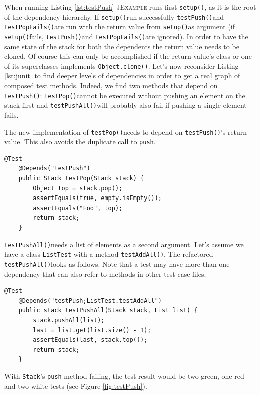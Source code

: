 \documentclass[11pt]{article}
\newcommand{\JExample}{\textsc{JExample}\xspace}
\newcommand{\ttt}[1]{\texttt{#1}}
\newcommand{\setup}{\ttt{setup()}}
\newcommand{\testPush}{\ttt{testPush()}}
\newcommand{\testPushAll}{\ttt{testPushAll()}}
\newcommand{\testPop}{\ttt{testPop()}}
\newcommand{\testPopFails}{\ttt{testPopFails()}}
\begin{document}
When running Listing \ref{lst:testPush} \JExample runs first \setup, as it is the root of the dependency hierarchy. If \setup run successfully \testPush and \testPopFails are run with the return value from \setup as argument (if \setup fails, \testPush and \testPopFails are ignored).
In order to have the same state of the stack for both the dependents the return value needs to be cloned. Of course this can only be accomplished if the return value's class or one of its superclasses implements \verb|Object.clone()|.
Let's now reconsider Listing \ref{lst:junit} to find deeper levels of dependencies in order to get a real graph of composed test methods.
Indeed, we find two methods that depend on \testPush: \testPop cannot be executed without pushing an element on the stack first and \testPushAll will probably also fail if pushing a single element fails.

The new implementation of \testPop needs to depend on \testPush's return value. This also avoids the duplicate call to \ttt{push}.

\begin{lstlisting}[label=lst:testpop,caption=Avoid code duplication using dependencies.]
    @Test
    @Depends("testPush")
    public Stack testPop(Stack stack) {
        Object top = stack.pop();
        assertEquals(true, empty.isEmpty());
        assertEquals("Foo", top);
        return stack;
    }
\end{lstlisting}

\testPushAll needs a list of elements as a second argument. Let's assume we have a class \ttt{ListTest} with a method \ttt{testAddAll()}. The refactored \testPushAll looks as follows. Note that a test may have more than one dependency that can also refer to methods in other test case files.

\begin{lstlisting}[label=lst:testpushall,caption=A test may have multiple dependencies.]
    @Test
    @Depends("testPush;ListTest.testAddAll")
    public stack testPushAll(Stack stack, List list) {
        stack.pushAll(list);
        last = list.get(list.size() - 1);
        assertEquals(last, stack.top());
        return stack;
    }
\end{lstlisting}

With \ttt{Stack}'s \ttt{push} method failing, the test result would be two green, one red and two white tests (see Figure \ref{fig:testPush}).
\end{document}
